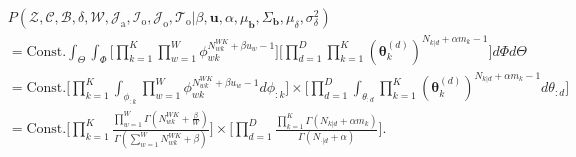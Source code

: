 \documentclass[a4paper]{article}
\begin{document}
  \begin{equation*}
  \begin{aligned}
  &P(\mathcal{Z}, \mathcal{C}, \mathcal{B},\delta, \mathcal{W},\mathcal{J}_{\mbox{a}}, \mathcal{I}_{\mbox{o}}, \mathcal{J}_{\mbox{o}}, \mathcal{T}_{\mbox{o}}| \beta, \boldsymbol{u}, \alpha, \mu_{\boldsymbol{b}}, \Sigma_{\boldsymbol{b}}, \mu_\delta, \sigma^2_\delta)\\&=\mbox{Const.}\int_{\Theta}\int_{\Phi}\Big[\prod_{k=1}^{K}\prod_{w=1}^{W}\phi_{wk}^{N^{WK}_{wk}+\beta u_w-1}\Big]\Big[\prod_{d=1}^{D}\prod_{k=1}^{K}(\boldsymbol{\theta}^{(d)}_{k})^{N_{k|d}+\alpha m_k-1}\Big]d\Phi d\Theta
  \\&=\mbox{Const.}\Big[\prod_{k=1}^{K}\int_{\phi_{:k}}\prod_{w=1}^{W}\phi_{wk}^{N^{WK}_{wk}+\beta u_w-1  }d\phi_{:k}\Big]\times\Big[\prod_{d=1}^{D}\int_{\theta_{:d}}\prod_{k=1}^{K}(\boldsymbol{\theta}^{(d)}_{k})^{N_{k|d}+\alpha m_k-1}d\theta_{:d}\Big]
  \\&=\mbox{Const.}\Big[\prod_{k=1}^{K}\frac{\prod_{w=1}^W\Gamma(N_{wk}^{WK}+\frac{\beta}{W})}{\Gamma(\sum_{w=1}^WN_{wk}^{WK}+\beta )}\Big]\times\Big[\prod_{d=1}^{D}\frac{\prod_{k=1}^K\Gamma(N_{k|d}+\alpha m_k)}{\Gamma(N_{\cdot|d}+\alpha)}\Big].
  \end{aligned}
  \end{equation*}
\end{document}
